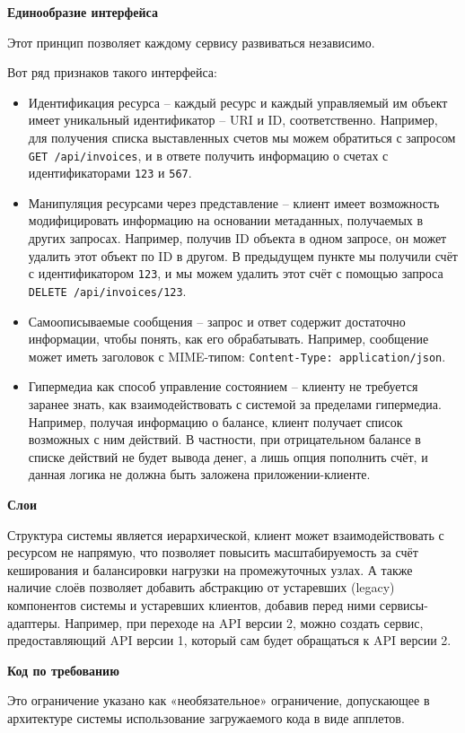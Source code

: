 \textbf{Единообразие интерфейса}

Этот принцип позволяет каждому сервису развиваться независимо.

Вот ряд признаков такого интерфейса:
\begin{itemize}
	\item Идентификация ресурса – каждый ресурс и каждый управляемый им объект имеет уникальный идентификатор – URI и ID, соответственно.
	Например, для получения списка выставленных счетов мы можем обратиться с запросом \texttt{GET /api/invoices}, и в ответе получить информацию о счетах с идентификаторами \texttt{123} и \texttt{567}.
	\item Манипуляция ресурсами через представление – клиент имеет возможность модифицировать информацию на основании метаданных, получаемых в других запросах.
	Например, получив ID объекта в одном запросе, он может удалить этот объект по ID в другом.
	В предыдущем пункте мы получили счёт с идентификатором \texttt{123}, и мы можем удалить этот счёт с помощью запроса \texttt{DELETE /api/invoices/123}.
	\item Самоописываемые сообщения – запрос и ответ содержит достаточно информации, чтобы понять, как его обрабатывать.
	Например, сообщение может иметь заголовок с MIME-типом: \texttt{Content-Type: application/json}.
	\item Гипермедиа как способ управление состоянием – клиенту не требуется заранее знать, как взаимодействовать с системой за пределами гипермедиа.
	Например, получая информацию о балансе, клиент получает список возможных с ним действий.
	В частности, при отрицательном балансе в списке действий не будет вывода денег, а лишь опция пополнить счёт, и данная логика не должна быть заложена приложении-клиенте.
\end{itemize}

\textbf{Слои}

Структура системы является иерархической, клиент может взаимодействовать с ресурсом не напрямую, что позволяет повысить масштабируемость за счёт кеширования и балансировки нагрузки на промежуточных узлах.
А также наличие слоёв позволяет добавить абстракцию от устаревших (legacy) компонентов системы и устаревших клиентов, добавив перед ними сервисы-адаптеры.
Например, при переходе на API версии 2, можно создать сервис, предоставляющий API версии 1, который сам будет обращаться к API версии 2.

\textbf{Код по требованию}

Это ограничение указано как «необязательное» ограничение, допускающее в архитектуре системы использование загружаемого кода в виде апплетов.


